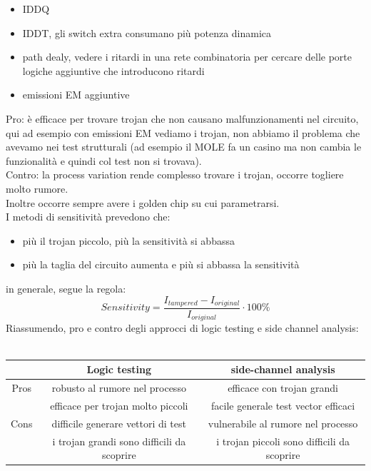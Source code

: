 \documentclass[oneside, 12pt]{extbook}
\begin{document}
\begin{itemize}
	\item IDDQ
	\item IDDT, gli switch extra consumano più potenza dinamica
	\item path dealy, vedere i ritardi in una rete combinatoria per cercare delle porte logiche aggiuntive che introducono ritardi
	\item emissioni EM aggiuntive
\end{itemize}
Pro: è efficace per trovare trojan che non causano malfunzionamenti nel circuito, qui ad esempio con emissioni EM vediamo i trojan, non abbiamo il problema che avevamo nei test strutturali (ad esempio il MOLE fa un casino ma non cambia le funzionalità  e quindi col test non si trovava).
\\Contro: la process variation rende complesso trovare i trojan, occorre togliere molto rumore.
\\Inoltre occorre sempre avere i golden chip su cui parametrarsi.
\\I metodi di sensitività prevedono che:
\begin{itemize}
	\item più il trojan piccolo, più la sensitività si abbassa
	\item più la taglia del circuito aumenta e più si abbassa la sensitività
\end{itemize}
in generale, segue la regola:
\begin{equation}
	Sensitivity = \dfrac{I_{tampered} - I_{original}}{I_{original}} \cdot 100\%
\end{equation}
Riassumendo, pro e contro degli approcci di logic testing e side channel analysis:\\\\
\begin{table}[!h]
	\begin{tabular}{c|c|c|}
		\hline
		 & Logic testing & side-channel analysis\\
		 \hline
		 Pros & robusto al rumore nel processo & efficace con trojan grandi\\
		 \hline
		  & efficace per trojan molto piccoli & facile generale test vector efficaci\\
		  \hline
		  Cons & difficile generare vettori di test & vulnerabile al rumore nel processo\\
		  \hline
		   & i trojan grandi sono difficili da scoprire & i trojan piccoli sono difficili da scoprire\\
		   \hline
	\end{tabular}
\end{table}
\end{document}
